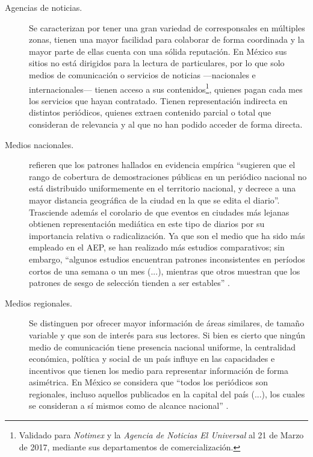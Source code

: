 \documentclass[letterpaper, 11pt]{book}
\theoremstyle{definition}
\theoremstyle{remark}
\begin{document}
\begin{description}
    
    \item[Agencias de noticias.] Se caracterizan por tener una gran variedad de corresponsales en múltiples zonas, tienen una mayor facilidad para colaborar de forma coordinada y la mayor parte de ellas cuenta con una sólida reputación. 
    En México sus sitios no está dirigidos para la lectura de particulares, por lo que solo medios de comunicación o servicios de noticias ---nacionales e internacionales--- tienen acceso a sus contenidos\footnote{Validado para \emph{Notimex} y la \emph{Agencia de Noticias El Universal} al 21 de Marzo de 2017, mediante sus departamentos de comercialización.}, quienes pagan cada mes los servicios que hayan contratado. 
    Tienen representación indirecta en distintos periódicos, quienes extraen contenido parcial o total que consideran de relevancia y al que no han podido acceder de forma directa.
    
    \item[Medios nacionales.] \citet{1999_BarrancoET_ValidityNewspapers} refieren que los patrones hallados en evidencia empírica ``sugieren que el rango de cobertura de demostraciones públicas en un periódico nacional no está distribuido uniformemente en el territorio nacional, y decrece a una mayor distancia geográfica de la ciudad en la que se edita el diario''. 
    Trasciende además el corolario de que eventos en ciudades más lejanas obtienen representación mediática en este tipo de diarios por su importancia relativa o radicalización. 
    Ya que son el medio que ha sido más empleado en el AEP, se han realizado más estudios comparativos; sin embargo, ``algunos estudios encuentran patrones inconsistentes en períodos cortos de una semana o un mes (...), mientras que otros muestran que los patrones de sesgo de selección tienden a ser estables'' \citep[351]{2014_Hutter_AEP}.
    
    \item[Medios regionales.] Se distinguen por ofrecer mayor información de áreas similares, de tamaño variable y que son de interés para sus lectores. 
    Si bien es cierto que ningún medio de comunicación tiene presencia nacional uniforme, la centralidad económica, política y social de un país influye en las capacidades e incentivos que tienen los medio para representar información de forma asimétrica. 
    En México se considera que ``todos los periódicos son regionales, incluso aquellos publicados en la capital del país (...), los cuales se consideran a sí mismos como de alcance nacional'' \citep[131]{2013_HuertaGomez_ConcentracionMedios}.
    

\end{description}
\end{document}
